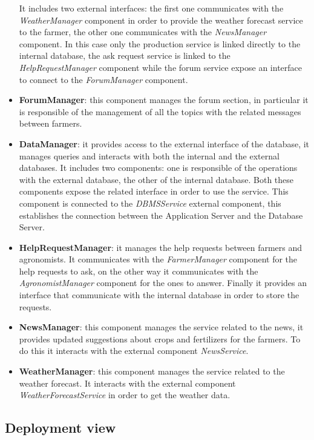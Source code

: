 \documentclass[table, 12pt]{article}
\begin{document}
\begin{itemize}
    It includes two external interfaces: the first one communicates with the \textit{WeatherManager} component in order to provide the weather forecast service to the farmer, the other one communicates with the \textit{NewsManager} component.
    In this case only the production service is linked directly to the internal database, the ask request service is linked to the \textit{HelpRequestManager} component while the forum service expose an interface to connect to the \textit{ForumManager} component.
    \item \textbf{ForumManager}: this component manages the forum section, in particular it is responsible of the management of all the topics with the related messages between farmers.
    \item \textbf{DataManager}: it provides access to the external interface of the database, it manages queries and interacts with both the internal and the external databases.
    It includes two components: one is responsible of the operations with the external database, the other of the internal database.
    Both these components expose the related interface in order to use the service.
    This component is connected to the \textit{DBMSService} external component, this establishes the connection between the Application Server and the Database Server.
    \item \textbf{HelpRequestManager}: it manages the help requests between farmers and agronomists.
    It communicates with the \textit{FarmerManager} component for the help requests to ask, on the other way it communicates with the \textit{AgronomistManager} component for the ones to answer.
    Finally it provides an interface that communicate with the internal database in order to store the requests.
    \item \textbf{NewsManager}: this component manages the service related to the news, it provides updated suggestions about crops and fertilizers for the farmers.
    To do this it interacts with the external component \textit{NewsService}.
    \item \textbf{WeatherManager}: this component manages the service related to the weather forecast.
    It interacts with the external component \textit{WeatherForecastService} in order to get the weather data.
\end{itemize}

\subsection{Deployment view}
\end{document}
